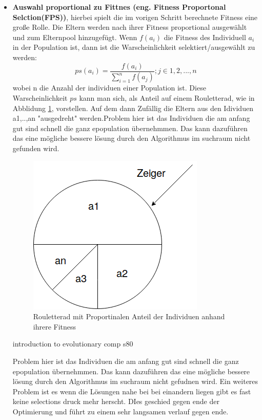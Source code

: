 \begin{itemize}
\item \textbf{Auswahl proportional zu Fittnes (eng. Fitness Proportonal Selction(FPS))}, hierbei spielt die im vorigen Schritt berechnete Fitness eine große Rolle. Die Eltern werden nach ihrer Fitness proportional ausgewählt und zum Elternpool hinzugefügt. Wenn $f(a_i)$ die Fitness des Individuell $a_i$ in der Population ist, dann ist die Warscheinlichkeit selektiert/ausgewählt zu werden:
\begin{equation}
	ps(a_i) = \frac{f(a_i)}{\sum_{i=1}^n f(a_j)}; j\in{1,2,...,n} \label{eq:1}
\end{equation}
wobei n die Anzahl der individuen einer Population ist.
Diese Warscheinlichkeit $ps$ kann man sich, als Anteil auf einem Rouletterad, wie in Abblidung \ref{fig:roulette_wheel}, vorstellen. Auf dem dann Zufällig die Eltern aus den Idividuen a1,..,an "ausgedreht" werden.Problem hier ist das Individuen die am anfang gut sind schnell die ganz epopulation übernehmmen. Das kann dazuführen das eine mögliche bessere lösung durch den Algorithmus im suchraum nicht gefunden wird.

\begin{figure}[htb]
  \centering  
  \includegraphics[scale=0.4]{img/roulette_wheel.png}
  \caption{Rouletterad mit Proportinalen Anteil der Individuen anhand ihrere Fitness}
  \label{fig:roulette_wheel}
\end{figure}


introduction to evolutionary comp s80

\iffalse
Problem hier ist das Individuen die am anfang gut sind schnell die ganz epopulation übernehmmen. Das kann dazuführen das eine mögliche bessere lösung durch den Algorithmus im suchraum nicht gefudnen wird. Ein weiteres Problem ist es wenn die Lösungen nahe bei bei einandern liegen gibt es fast keine selections druck mehr herscht. DIes geschied gegen ende der Optimierung und führt zu einem sehr langsamen verlauf gegen ende. 


\end{itemize}
